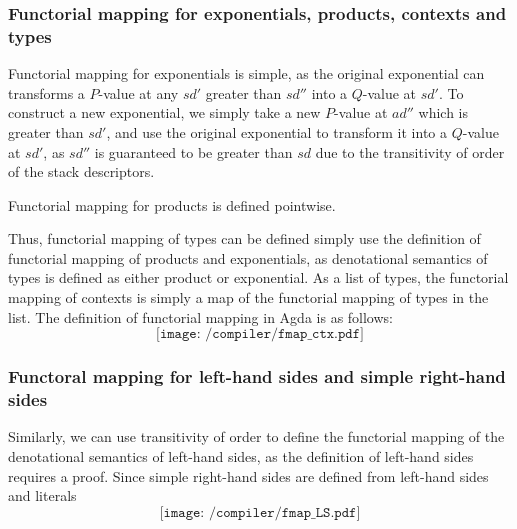 \documentclass[12pt,a4paper]{report}
\theoremstyle{definition}
\begin{document}
    \subsubsection{Functorial mapping for exponentials, products, contexts and types}
    Functorial mapping for exponentials is simple, as the original exponential can transforms a $P$-value at any $sd'$ greater than $sd''$ into a $Q$-value at $sd'$. To construct a new exponential, we simply take a new $P$-value at $ad''$ which is greater than $sd'$, and use the original exponential to transform it into a $Q$-value at $sd'$, as $sd''$ is guaranteed to be greater than $sd$ due to the transitivity of order of the stack descriptors. 

    Functorial mapping for products is defined pointwise.

    Thus, functorial mapping of types can be defined simply use the definition of functorial mapping of products and exponentials, as denotational semantics of types is defined as either product or exponential. As a list of types, the functorial mapping of contexts is simply a map of the functorial mapping of types in the list. The definition of functorial mapping in Agda is as follows:
    \[\texttt{[image: /compiler/fmap\_ctx.pdf]}\]

    \subsubsection{Functoral mapping for left-hand sides and simple right-hand sides}
    Similarly, we can use transitivity of order to define the functorial mapping of the denotational semantics of left-hand sides, as the definition of left-hand sides requires a proof. Since simple right-hand sides are defined from left-hand sides and literals
    \[\texttt{[image: /compiler/fmap\_LS.pdf]}\]
\end{document}
